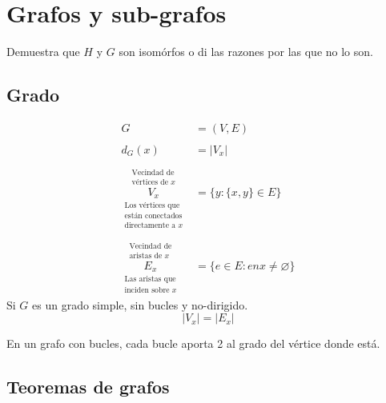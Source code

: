 \documentclass[../main.tex]{subfiles}
\begin{document}
\chapter{Grafos y sub-grafos}%

\thispagestyle{fancy}

\begin{figure}[H]
	\centering
	
\end{figure}

Demuestra que $H$ y $G$ son isomórfos o di las razones por las que no lo son.

\section{Grado}%
\label{sec:grado}

\begin{align*}
	G&=(V,E)\\
	\\
	d_G(x)&=
	\left|
		V_x
	\right|\\
	\\
	\overset
	{
		\substack
		{
			\text{Vecindad de}\\
			\text{vértices de $x$}
		}
	}
	{
		\underset
		{
			\substack
			{
				\text{Los vértices que}\\
				\text{están conectados}\\
				\text{directamente a $x$}
			}
		}
		{
			V_x
		}
	}
	&= \{y:\{x,y\}\in E\}\\
	\\
	\overset
	{
		\substack
		{
			\text{Vecindad de}\\
			\text{aristas de $x$}
		}
	}
	{
		\underset
		{
			\substack
			{
				\text{Las aristas que}\\
				\text{inciden sobre $x$}
			}
		}
		{
			E_x
		}
	}
	&= \{e\in E:enx\neq\varnothing\}
\end{align*}
Si $G$ es un grado simple, sin bucles y no-dirigido.
\[
	|V_x| = |E_x|
\]

En un grafo con bucles, cada bucle aporta 2 al grado del vértice donde está.

\begin{figure}[H]
	\centering
	
\end{figure}
\section{Teoremas de grafos}%
\label{sec:teoremas_de_grafos}
\end{document}
